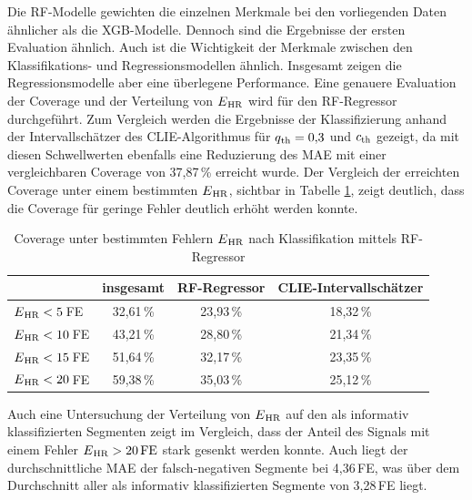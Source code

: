  Die \ac{RF}-Modelle gewichten die einzelnen Merkmale bei den vorliegenden Daten ähnlicher als die \ac{XGB}-Modelle. Dennoch sind die Ergebnisse der ersten Evaluation ähnlich. Auch ist die Wichtigkeit der Merkmale zwischen den Klassifikations- und Regressionsmodellen ähnlich. Insgesamt zeigen die Regressionsmodelle aber eine überlegene Performance. Eine genauere Evaluation der Coverage und der Verteilung von $E\textsubscript{HR}$ wird für den \ac{RF}-Regressor durchgeführt. Zum Vergleich werden die Ergebnisse der Klassifizierung anhand der Intervallschätzer des \ac{CLIE}-Algorithmus für $q\textsubscript{th}=0{,}3$ und $c\textsubscript{th}$ gezeigt, da mit diesen Schwellwerten ebenfalls eine Reduzierung des \ac{MAE} mit einer vergleichbaren Coverage von 37,87\,\% erreicht wurde. Der Vergleich der erreichten Coverage unter einem bestimmten $E\textsubscript{HR}$, sichtbar in Tabelle \ref{fig:own-coverage-default}, zeigt deutlich, dass die Coverage für geringe Fehler deutlich erhöht werden konnte. 
 
  \begin{table}[h]
 	\centering
  	\begin{tabular}{l || c | c | c}
 											& insgesamt 		& \ac{RF}-Regressor & \ac{CLIE}-Intervallschätzer\\\hline
 		$E\textsubscript{HR} < 5$\,\si{FE} 	&  32{,}61\,\% 	& 23,93\,\% 			& 18,32\,\%\\
 		$E\textsubscript{HR} < 10$\,\si{FE} 	&  43{,}21\,\% 	& 28,80\,\% 			& 21,34\,\%\\
 		$E\textsubscript{HR} < 15$\,\si{FE} 	&  51{,}64\,\% 	& 32,17\,\% 			& 23,35\,\%\\
 		$E\textsubscript{HR} < 20$\,\si{FE} 	&  59{,}38\,\% 	& 35,03\,\% 			& 25,12\,\%\\
 	\end{tabular}
 	\caption[Coverage unter bestimmten Fehlern $E\textsubscript{HR}$ nach Klassifikation mittels \ac{RF}-Regressor]{Coverage unter bestimmten Fehlern $E\textsubscript{HR}$ nach Klassifikation mittels \ac{RF}-Regressor}
 	\label{fig:own-coverage-default}
 \end{table}
 
 Auch eine Untersuchung der Verteilung von $E\textsubscript{HR}$ auf den als informativ klassifizierten Segmenten zeigt im Vergleich, dass der Anteil des Signals mit einem Fehler $E\textsubscript{HR} > 20\,\si{FE}$ stark gesenkt werden konnte. Auch liegt der durchschnittliche \ac{MAE} der falsch-negativen Segmente bei 4,36\,\si{FE}, was über dem Durchschnitt aller als informativ klassifizierten Segmente von 3,28\,\si{FE} liegt.
 
